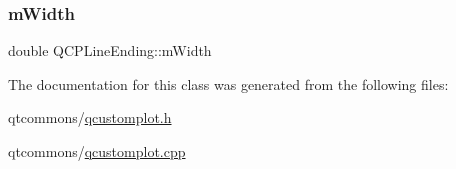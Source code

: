 \mbox{\label{class_q_c_p_line_ending_aca89d21341133c20dc6825c33a5eac48}} 
\subsubsection{\texorpdfstring{mWidth}{mWidth}}
{\footnotesize\ttfamily double Q\+C\+P\+Line\+Ending\+::m\+Width\hspace{0.3cm}{\ttfamily [protected]}}



The documentation for this class was generated from the following files\+:\begin{DoxyCompactItemize}
\item 
qtcommons/\mbox{\hyperlink{qcustomplot_8h}{qcustomplot.\+h}}\item 
qtcommons/\mbox{\hyperlink{qcustomplot_8cpp}{qcustomplot.\+cpp}}\end{DoxyCompactItemize}
